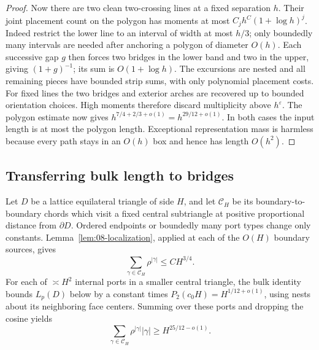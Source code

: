\begin{proof}
Now there are two clean two-crossing lines at a fixed separation \(h\).
Their joint placement count on the polygon has moments at most
\(C_jh^C(1+\log h)^j\). Indeed restrict the lower line to an interval of
width at most \(h/3\); only boundedly many intervals are needed after
anchoring a polygon of diameter \(O(h)\). Each successive gap \(g\)
then forces two bridges in the lower band and two in the upper, giving
\((1+g)^{-1}\); its sum is \(O(1+\log h)\). The excursions are nested
and all remaining pieces have bounded strip sums, with only polynomial
placement costs. For fixed lines the two bridges and exterior arches are
recovered up to bounded orientation choices. High moments therefore
discard multiplicity above \(h^\varepsilon\). The polygon estimate now
gives \(h^{7/4+2/3+o(1)}=h^{29/12+o(1)}\).
In both cases the input length is at most the polygon length. Exceptional
representation mass is harmless because every path stays in an \(O(h)\)
box and hence has length \(O(h^2)\).
\end{proof}

\subsection{Transferring bulk length to bridges}

Let \(D\) be a lattice equilateral triangle of side \(H\), and let
\(\mathcal C_H\) be its boundary-to-boundary chords which visit a fixed
central subtriangle at positive proportional distance from \(\partial D\).
Ordered endpoints or boundedly many port types change only constants.
Lemma~\ref{lem:08-localization}, applied at each of the \(O(H)\)
boundary sources, gives
\[
 \sum_{\gamma\in\mathcal C_H}\rho^{|\gamma|}\le CH^{3/4}.
\]
For each of \(\asymp H^2\) internal ports in a smaller central triangle,
the bulk identity bounds \(L_p(D)\) below by a constant times
\(P_2(c_0H)=H^{1/12+o(1)}\), using nests about its neighboring face
centers. Summing over these ports and dropping the cosine yields
\[
 \sum_{\gamma\in\mathcal C_H}\rho^{|\gamma|}|\gamma|
       \ge H^{25/12-o(1)}.
\]

